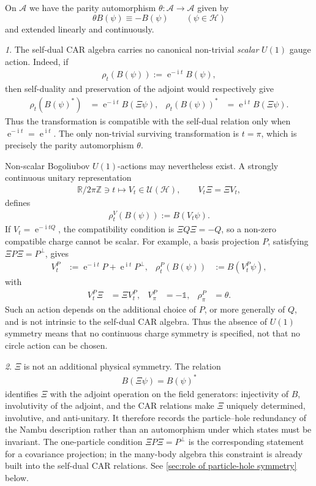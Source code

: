 \documentclass[a4paper,10pt]{article}
\numberwithin{equation}{section}
\theoremstyle{plain}
\theoremstyle{plain}
\theoremstyle{plain}
\theoremstyle{plain}
\theoremstyle{plain}
\theoremstyle{remark}
\newtheorem{rem}[rem]{\protect\remarkname}
\theoremstyle{definition}
\providecommand{\remarkname}{Remark}
\newcommand{\ee}{\operatorname{e}}
\newcommand{\ii}{\operatorname{i}}
\newcommand{\ZZ}{\mathbb{Z}}
\newcommand{\RR}{\mathbb{R}}
\newcommand{\calU}{\mathcal{U}}
\newcommand{\calH}{\mathcal{H}}
\newcommand{\Id}{\mathds{1}}
\newcommand{\eq}[1]{\begin{align*}#1\end{align*}}
\begin{document}
On $\mathcal{A}$ we have the parity automorphism $\theta:\mathcal{A}\to\mathcal{A}$
given by 
\[
\theta B\left(\psi\right)\equiv-B\left(\psi\right)\qquad\left(\psi\in\mathcal{H}\right)
\]
and extended linearly and continuously.

\begin{rem}The self-dual CAR algebra carries no canonical non-trivial
\emph{scalar} \(U(1)\) gauge action. Indeed, if
\eq{
    \rho_t\left(B(\psi)\right)
    :=
    \ee^{-\ii t}B(\psi),
}
then self-duality and preservation of the adjoint would respectively give
\eq{
    \rho_t\left(B(\psi)^*\right)
    &=
    \ee^{-\ii t}B(\Xi\psi),&
    \rho_t\left(B(\psi)\right)^*
    &=
    \ee^{\ii t}B(\Xi\psi).
}
Thus the transformation is compatible with the self-dual relation only
when \(\ee^{-\ii t}=\ee^{\ii t}\). The only non-trivial surviving
transformation is \(t=\pi\), which is precisely the parity automorphism
\(\theta\).

Non-scalar Bogoliubov \(U(1)\)-actions may nevertheless exist. A strongly
continuous unitary representation
\eq{
    \RR/2\pi\ZZ\ni t
    \longmapsto
    V_t\in\calU(\calH),
    \qquad
    V_t\Xi=\Xi V_t,
}
defines
\eq{
    \rho_t^V\left(B(\psi)\right)
    :=
    B(V_t\psi).
}
If \(V_t=\ee^{-\ii tQ}\), the compatibility condition is
\(\Xi Q\Xi=-Q\), so a non-zero compatible charge cannot be scalar. For
example, a basis projection \(P\), satisfying
\(\Xi P\Xi=P^\perp\), gives
\eq{
    V_t^P
    &:=
    \ee^{-\ii t}P+\ee^{\ii t}P^\perp,&
    \rho_t^P\left(B(\psi)\right)
    &:=
    B(V_t^P\psi),
}
with
\eq{
    V_t^P\Xi
    &=
    \Xi V_t^P,&
    V_\pi^P
    &=
    -\Id,&
    \rho_\pi^P
    &=
    \theta.
}
Such an action depends on the additional choice of \(P\), or more generally
of \(Q\), and is not intrinsic to the self-dual CAR algebra. Thus the
absence of \(U(1)\) symmetry means that no continuous charge symmetry is
specified, not that no circle action can be chosen.
\end{rem}

\begin{rem}\(\Xi\) is not an additional physical symmetry. The relation
\eq{
    B(\Xi\psi)
    =
    B(\psi)^*
}
identifies \(\Xi\) with the adjoint operation on the field generators:
injectivity of \(B\), involutivity of the adjoint, and the CAR relations
make \(\Xi\) uniquely determined, involutive, and anti-unitary. It therefore
records the particle--hole redundancy of the Nambu description rather than
an automorphism under which states must be invariant. The one-particle
condition \(\Xi P\Xi=P^\perp\) is the corresponding statement for a
covariance projection; in the many-body algebra this constraint is already
built into the self-dual CAR relations. See
\cref{sec:role of particle-hole symmetry} below.
\end{rem}
\end{document}
